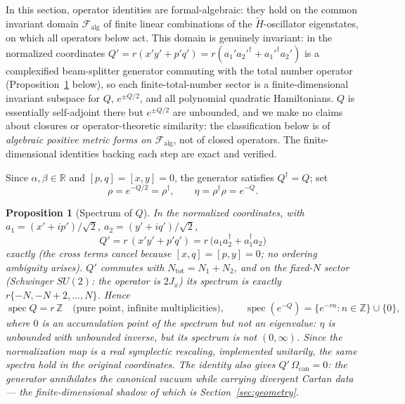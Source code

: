 \documentclass[11pt]{article}
\newtheorem{proposition}[theorem]{Proposition}
\theoremstyle{definition}
\theoremstyle{remark}
\newcommand{\R}{\mathbb{R}}
\newcommand{\Z}{\mathbb{Z}}
\newcommand{\dg}{\dagger}
\begin{document}
In this section, operator identities are formal-algebraic: they hold on the
common invariant domain $\mathcal F_{\mathrm{alg}}$ of finite linear
combinations of the
$\widetilde H$-oscillator eigenstates, on which all operators below act.
This domain is genuinely invariant: in the normalized coordinates
$Q'=r(x'y'+p'q')=r(a_1'a_2'^{\dg}+a_1'^{\dg}a_2')$ is a complexified
beam-splitter generator commuting with the total number operator
(Proposition~\ref{prop:specQ} below), so each finite-total-number sector
is a finite-dimensional invariant subspace for $Q$, $e^{\pm Q/2}$, and
all polynomial quadratic Hamiltonians.  $Q$ is essentially self-adjoint
there but $e^{\pm Q/2}$ are unbounded, and we
make no claims about closures or operator-theoretic similarity: the
classification below is of \emph{algebraic positive metric forms on
$\mathcal F_{\mathrm{alg}}$}, not of closed operators.  The
finite-dimensional identities backing each step are exact and verified.

Since $\alpha,\beta\in\R$ and $[p,q]=[x,y]=0$, the generator satisfies
$Q^{\dg}=Q$; set
\begin{equation}
\rho=e^{-Q/2}=\rho^{\dg},
\qquad
\eta=\rho^{\dg}\rho=e^{-Q} .
\end{equation}

\begin{proposition}[Spectrum of $Q$]\label{prop:specQ}
In the normalized coordinates, with $a_1=(x'+ip')/\sqrt2$,
$a_2=(y'+iq')/\sqrt2$,
\begin{equation}
Q'=r\,(x'y'+p'q')=r\,\big(a_1a_2^{\dg}+a_1^{\dg}a_2\big)
\end{equation}
exactly (the cross terms cancel because $[x,q]=[p,y]=0$; no ordering
ambiguity arises).  $Q'$ commutes with $N_{\mathrm{tot}}=N_1+N_2$, and on
the fixed-$N$ sector (Schwinger $SU(2)$: the operator is $2J_x$) its
spectrum is exactly $r\{-N,-N+2,\dots,N\}$.  Hence
\begin{equation}
\operatorname{spec}Q=r\,\Z
\quad\text{(pure point, infinite multiplicities)},
\qquad
\operatorname{spec}(e^{-Q})=\{e^{-rn}:n\in\Z\}\cup\{0\},
\end{equation}
where $0$ is an accumulation point of the spectrum but not an eigenvalue:
$\eta$ is unbounded with unbounded inverse, but its spectrum is not
$(0,\infty)$.  Since the normalization map is a real symplectic
rescaling, implemented unitarily, the same spectra hold in the original
coordinates.  The identity also gives $Q'\,\Omega_{\mathrm{can}}=0$: the
generator annihilates the canonical vacuum while carrying divergent
Cartan data --- the finite-dimensional shadow of which is
Section~\ref{sec:geometry}.
\end{proposition}
\end{document}
